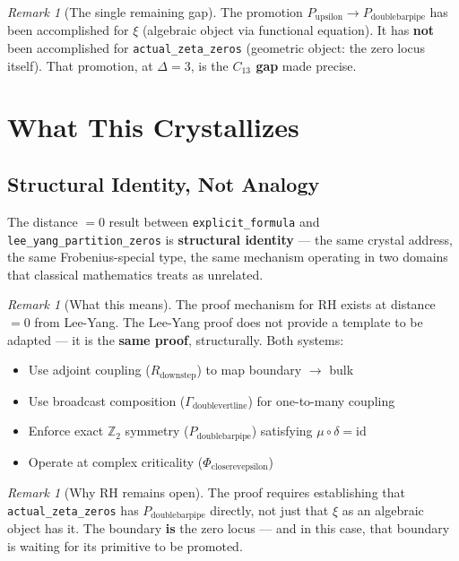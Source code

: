 \documentclass[12pt,oneside]{article}
\theoremstyle{definition}
\theoremstyle{remark}
\newtheorem{remark}[theorem]{Remark}
\newcommand{\Rdownstep}{R_{\text{downstep}}}
\newcommand{\Pdoublebarpipe}{P_{\text{doublebarpipe}}}
\newcommand{\Pupsilon}{P_{\text{upsilon}}}
\newcommand{\Gammadoublevertline}{\Gamma_{\text{doublevertline}}}
\newcommand{\Phicloserevepsilon}{\Phi_{\text{closerevepsilon}}}
\begin{document}
\begin{remark}[The single remaining gap]
The promotion $\Pupsilon \to \Pdoublebarpipe$ has been accomplished for $\xi$ (algebraic object via functional equation). It has \textbf{not} been accomplished for \texttt{actual\_zeta\_zeros} (geometric object: the zero locus itself). That promotion, at $\Delta = 3$, is the \textbf{$C_{13}$ gap} made precise.
\end{remark}

\section{What This Crystallizes}

\subsection{Structural Identity, Not Analogy}

The distance $= 0$ result between \texttt{explicit\_formula} and \texttt{lee\_yang\_partition\_zeros} is \textbf{structural identity} --- the same crystal address, the same Frobenius-special type, the same mechanism operating in two domains that classical mathematics treats as unrelated.

\begin{remark}[What this means]
The proof mechanism for RH exists at distance $= 0$ from Lee-Yang. The Lee-Yang proof does not provide a template to be adapted --- it is the \textbf{same proof}, structurally. Both systems:
\begin{itemize}
\item Use adjoint coupling ($\Rdownstep$) to map boundary $\to$ bulk
\item Use broadcast composition ($\Gammadoublevertline$) for one-to-many coupling
\item Enforce exact $\mathbb{Z}_2$ symmetry ($\Pdoublebarpipe$) satisfying $\mu \circ \delta = \text{id}$
\item Operate at complex criticality ($\Phicloserevepsilon$)
\end{itemize}
\end{remark}

\begin{remark}[Why RH remains open]
The proof requires establishing that \texttt{actual\_zeta\_zeros} has $\Pdoublebarpipe$ directly, not just that $\xi$ as an algebraic object has it. The boundary \textbf{is} the zero locus --- and in this case, that boundary is waiting for its primitive to be promoted.
\end{remark}
\end{document}

